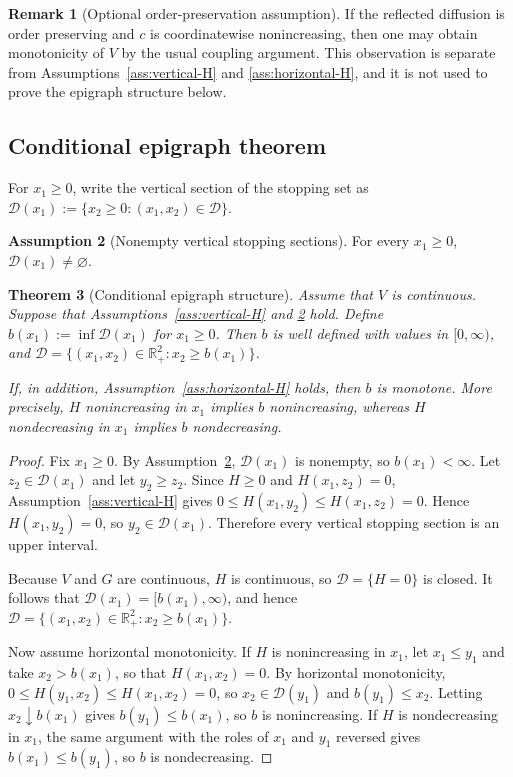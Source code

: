 \documentclass[pdflatex,sn-mathphys-num]{sn-jnl}
\theoremstyle{plain}
\newtheorem{theorem}{Theorem}[section]
\theoremstyle{definition}
\newtheorem{assumption}[theorem]{Assumption}
\newtheorem{remark}[theorem]{Remark}
\newcommand{\R}{\mathbb{R}}
\begin{document}
\begin{remark}[Optional order-preservation assumption]
\label{rem:order-preservation-optional}
If the reflected diffusion is order preserving and $c$ is coordinatewise
nonincreasing, then one may obtain monotonicity of $V$ by the usual coupling
argument. This observation is separate from Assumptions~\ref{ass:vertical-H}
and \ref{ass:horizontal-H}, and it is not used to prove the epigraph structure
below.
\end{remark}

\subsection{Conditional epigraph theorem}
\label{sec:conditional-epigraph}
For $x_1\ge0$, write the vertical section of the stopping set as
$   \mathcal D(x_1):=\{x_2\ge0:(x_1,x_2)\in\mathcal D\}$.

\begin{assumption}[Nonempty vertical stopping sections]
\label{ass:nonempty-sections}
For every $x_1\ge0$, $\mathcal D(x_1)\ne\varnothing$.
\end{assumption}

\begin{theorem}[Conditional epigraph structure]
\label{thm:conditional-epigraph}
Assume that $V$ is continuous. Suppose that Assumptions~\ref{ass:vertical-H}
and \ref{ass:nonempty-sections} hold. Define
$   b(x_1):=\inf\mathcal D(x_1)$ for $x_1\ge0$.
Then $b$ is well defined with values in $[0,\infty)$, and
$   \mathcal D
   =
   \{(x_1,x_2)\in\R^2_+:x_2\ge b(x_1)\}$.
   
If, in addition, Assumption~\ref{ass:horizontal-H} holds, then $b$ is
monotone. More precisely, $H$ nonincreasing in $x_1$ implies $b$ nonincreasing,
whereas $H$ nondecreasing in $x_1$ implies $b$ nondecreasing.
\end{theorem}
\begin{proof}
Fix $x_1\ge0$. By Assumption~\ref{ass:nonempty-sections}, $\mathcal D(x_1)$ is
nonempty, so $b(x_1)<\infty$. Let $z_2\in\mathcal D(x_1)$ and let $y_2\ge z_2$.
Since $H\ge0$ and $H(x_1,z_2)=0$, Assumption~\ref{ass:vertical-H} gives
$0\le H(x_1,y_2)\le H(x_1,z_2)=0$. Hence $H(x_1,y_2)=0$, so
$y_2\in\mathcal D(x_1)$. Therefore every vertical stopping section is an upper
interval.

Because $V$ and $G$ are continuous, $H$ is continuous, so $\mathcal D=\{H=0\}$
is closed. It follows that $\mathcal D(x_1)=[b(x_1),\infty)$, and hence
$\mathcal D=\{(x_1,x_2)\in\R^2_+:x_2\ge b(x_1)\}$.

Now assume horizontal monotonicity. If $H$ is nonincreasing in $x_1$, let
$x_1\le y_1$ and take $x_2>b(x_1)$, so that $H(x_1,x_2)=0$. By horizontal
monotonicity, $0\le H(y_1,x_2)\le H(x_1,x_2)=0$, so $x_2\in\mathcal D(y_1)$ and
$b(y_1)\le x_2$. Letting $x_2\downarrow b(x_1)$ gives $b(y_1)\le b(x_1)$, so
$b$ is nonincreasing. If $H$ is nondecreasing in $x_1$, the same argument with
the roles of $x_1$ and $y_1$ reversed gives $b(x_1)\le b(y_1)$, so $b$ is
nondecreasing.
\end{proof}
\end{document}
